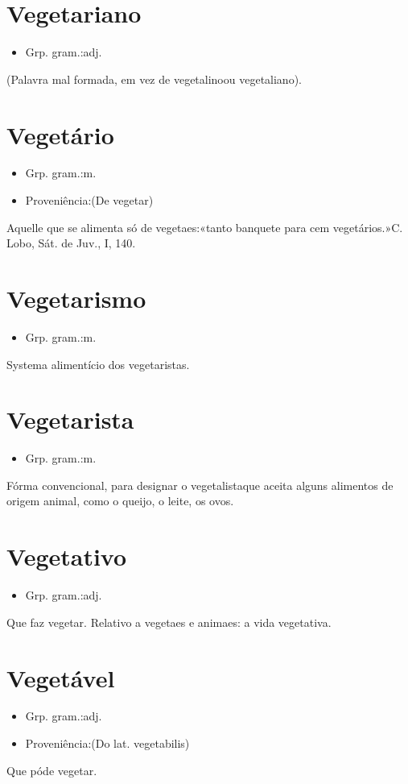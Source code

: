\documentclass{article}
\begin{document}
\section{Vegetariano}
\begin{itemize}
\item {Grp. gram.:adj.}
\end{itemize}
(Palavra mal formada, em vez de \textunderscore vegetalino\textunderscore  ou \textunderscore vegetaliano\textunderscore ).
\section{Vegetário}
\begin{itemize}
\item {Grp. gram.:m.}
\end{itemize}
\begin{itemize}
\item {Proveniência:(De \textunderscore vegetar\textunderscore )}
\end{itemize}
Aquelle que se alimenta só de vegetaes:«\textunderscore tanto banquete para cem vegetários.\textunderscore »C. Lobo, \textunderscore Sát. de Juv.\textunderscore , I, 140.
\section{Vegetarismo}
\begin{itemize}
\item {Grp. gram.:m.}
\end{itemize}
Systema alimentício dos vegetaristas.
\section{Vegetarista}
\begin{itemize}
\item {Grp. gram.:m.}
\end{itemize}
Fórma convencional, para designar o \textunderscore vegetalista\textunderscore  que aceita alguns alimentos de origem animal, como o queijo, o leite, os ovos.
\section{Vegetativo}
\begin{itemize}
\item {Grp. gram.:adj.}
\end{itemize}
Que faz vegetar.
Relativo a vegetaes e animaes: \textunderscore a vida vegetativa\textunderscore .
\section{Vegetável}
\begin{itemize}
\item {Grp. gram.:adj.}
\end{itemize}
\begin{itemize}
\item {Proveniência:(Do lat. \textunderscore vegetabilis\textunderscore )}
\end{itemize}
Que póde vegetar.
\end{document}
